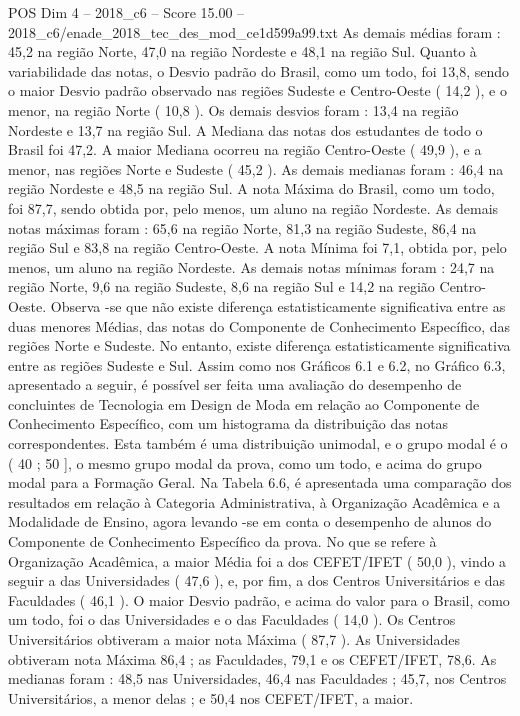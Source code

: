 \begin{textsample}{POS Dim 4 – 2018\_c6 – Score 15.00 – 2018\_c6/enade\_2018\_tec\_des\_mod\_ce1d599a99.txt}
As demais médias foram : 45,2 na região Norte, 47,0 na região Nordeste e 48,1 na região Sul.
Quanto à variabilidade das notas, o Desvio padrão do Brasil, como um todo, foi 13,8, sendo o maior Desvio padrão observado nas regiões Sudeste e Centro-Oeste ( 14,2 ), e o menor, na região Norte ( 10,8 ).
Os demais desvios foram : 13,4 na região Nordeste e 13,7 na região Sul.
A Mediana das notas dos estudantes de todo o Brasil foi 47,2.
A maior Mediana ocorreu na região Centro-Oeste ( 49,9 ), e a menor, nas regiões Norte e Sudeste ( 45,2 ).
As demais medianas foram : 46,4 na região Nordeste e 48,5 na região Sul.
A nota Máxima do Brasil, como um todo, foi 87,7, sendo obtida por, pelo menos, um aluno na região Nordeste.
As demais notas máximas foram : 65,6 na região Norte, 81,3 na região Sudeste, 86,4 na região Sul e 83,8 na região Centro-Oeste.
A nota Mínima foi 7,1, obtida por, pelo menos, um aluno na região Nordeste.
As demais notas mínimas foram : 24,7 na região Norte, 9,6 na região Sudeste, 8,6 na região Sul e 14,2 na região Centro-Oeste.
Observa -se que não existe diferença estatisticamente significativa entre as duas menores Médias, das notas do Componente de Conhecimento Específico, das regiões Norte e Sudeste.
No entanto, existe diferença estatisticamente significativa entre as regiões Sudeste e Sul.
Assim como nos Gráficos 6.1 e 6.2, no Gráfico 6.3, apresentado a seguir, é possível ser feita uma avaliação do desempenho de concluintes de Tecnologia em Design de Moda em relação ao Componente de Conhecimento Específico, com um histograma da distribuição das notas correspondentes.
Esta também é uma distribuição unimodal, e o grupo modal é o ( 40 ; 50 ], o mesmo grupo modal da prova, como um todo, e acima do grupo modal para a Formação Geral.
Na Tabela 6.6, é apresentada uma comparação dos resultados em relação à Categoria Administrativa, à Organização Acadêmica e a Modalidade de Ensino, agora levando -se em conta o desempenho de alunos do Componente de Conhecimento Específico da prova.
No que se refere à Organização Acadêmica, a maior Média foi a dos CEFET/IFET ( 50,0 ), vindo a seguir a das Universidades ( 47,6 ), e, por fim, a dos Centros Universitários e das Faculdades ( 46,1 ).
O maior Desvio padrão, e acima do valor para o Brasil, como um todo, foi o das Universidades e o das Faculdades ( 14,0 ).
Os Centros Universitários obtiveram a maior nota Máxima ( 87,7 ).
As Universidades obtiveram nota Máxima 86,4 ; as Faculdades, 79,1 e os CEFET/IFET, 78,6.
As medianas foram : 48,5 nas Universidades, 46,4 nas Faculdades ; 45,7, nos Centros Universitários, a menor delas ; e 50,4 nos CEFET/IFET, a maior.

\end{textsample}
